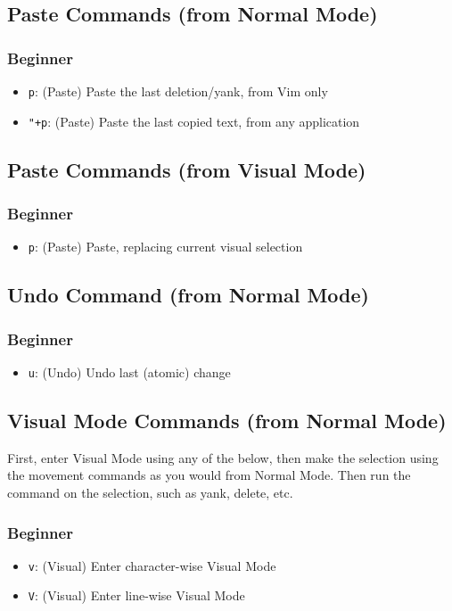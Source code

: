 \documentclass[11pt]{article}
\begin{document}
\subsection{Paste Commands (from Normal Mode)}
\label{sec:org4120f15}
\subsubsection{Beginner}
\label{sec:orgeee0e21}
\begin{itemize}
\item \texttt{p}: (Paste) Paste the last deletion/yank, from Vim only
\item \texttt{"+p}: (Paste) Paste the last copied text, from any application
\end{itemize}
\subsection{Paste Commands (from Visual Mode)}
\label{sec:org8f535a5}
\subsubsection{Beginner}
\label{sec:org1b0dc54}
\begin{itemize}
\item \texttt{p}: (Paste) Paste, replacing current visual selection
\end{itemize}
\subsection{Undo Command (from Normal Mode)}
\label{sec:org69c81e2}
\subsubsection{Beginner}
\label{sec:orge1cf1a8}
\begin{itemize}
\item \texttt{u}: (Undo) Undo last (atomic) change
\end{itemize}
\subsection{Visual Mode Commands (from Normal Mode)}
\label{sec:org3f91770}
First, enter Visual Mode using any of the below, then make the selection using
the movement commands as you would from Normal Mode. Then run the command on the
selection, such as yank, delete, etc.
\subsubsection{Beginner}
\label{sec:orgeaee31a}
\begin{itemize}
\item \texttt{v}: (Visual) Enter character-wise Visual Mode
\item \texttt{V}: (Visual) Enter line-wise Visual Mode
\end{itemize}
\end{document}
